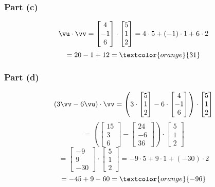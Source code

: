 \begin{sol}
    \subsubsection*{Part (c)}
    \[
    \vu \cdot \vv = \begin{bmatrix} 4 \\ -1 \\ 6 \end{bmatrix} \cdot \begin{bmatrix} 5 \\ 1 \\ 2 \end{bmatrix} = 4 \cdot 5 + (-1) \cdot 1 + 6 \cdot 2
    \]
    \[
    = 20 - 1 + 12 = \textcolor{orange}{31}
    \]
    
    \subsubsection*{Part (d)}
    \[
    (3\vv - 6\vu) \cdot \vv = \left(3 \cdot \begin{bmatrix} 5 \\ 1 \\ 2 \end{bmatrix} - 6 \cdot \begin{bmatrix} 4 \\ -1 \\ 6 \end{bmatrix}\right) \cdot \begin{bmatrix} 5 \\ 1 \\ 2 \end{bmatrix}
    \]
    \[
    = \left(\begin{bmatrix} 15 \\ 3 \\ 6 \end{bmatrix} - \begin{bmatrix} 24 \\ -6 \\ 36 \end{bmatrix}\right) \cdot \begin{bmatrix} 5 \\ 1 \\ 2 \end{bmatrix}
    \]
    \[
    = \begin{bmatrix} -9 \\ 9 \\ -30 \end{bmatrix} \cdot \begin{bmatrix} 5 \\ 1 \\ 2 \end{bmatrix} = -9 \cdot 5 + 9 \cdot 1 + (-30) \cdot 2
    \]
    \[
    = -45 + 9 - 60 = \textcolor{orange}{-96}
    \]
    

\end{sol}
